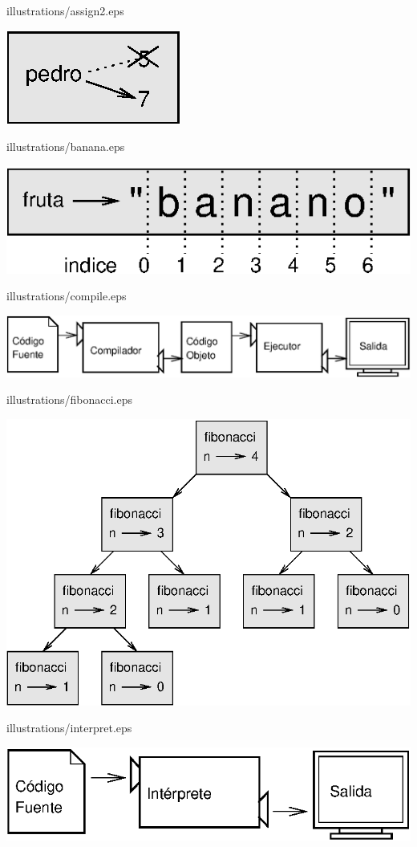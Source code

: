 illustrations/assign2.eps

\centerline{\includegraphics{illustrations/assign2.eps}}

illustrations/banana.eps

\centerline{\includegraphics{illustrations/banana.eps}}

illustrations/compile.eps

\centerline{\includegraphics{illustrations/compile.eps}}

illustrations/fibonacci.eps

\centerline{\includegraphics{illustrations/fibonacci.eps}}

illustrations/interpret.eps

\centerline{\includegraphics{illustrations/interpret.eps}}


